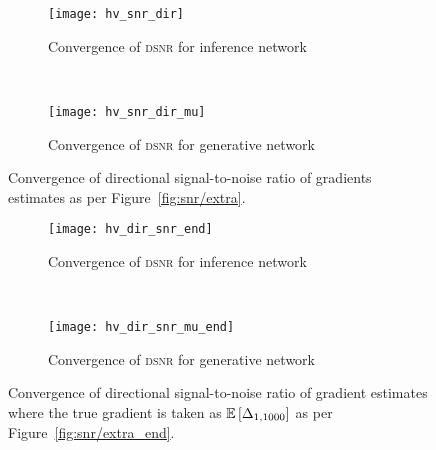 \begin{figure}[h]
	\centering
	\begin{subfigure}[b]{0.45\textwidth}
		\centering
		\texttt{[image: hv\_snr\_dir]}
		\caption{Convergence of \textsc{dsnr} for inference network\label{fig:hv/snr_dir}}
	\end{subfigure}~~~~~~~~~~
	\begin{subfigure}[b]{0.45\textwidth}
		\centering
		\texttt{[image: hv\_snr\_dir\_mu]}
		\caption{Convergence of \textsc{dsnr} for generative network\label{fig:hv/snr_dir_mu}}
	\end{subfigure}
	\caption{Convergence of directional signal-to-noise ratio of gradients estimates 
		as per Figure~\ref{fig:snr/extra}.
		\label{fig:hv/extra_end}}
\end{figure}

\begin{figure}[h]
	\centering
	\begin{subfigure}[b]{0.45\textwidth}
		\centering
		\texttt{[image: hv\_dir\_snr\_end]}
		\caption{Convergence of \textsc{dsnr} for inference network\label{fig:snr/hv_snr_dir_end}}
	\end{subfigure} ~~~~~~~~~~
	\begin{subfigure}[b]{0.45\textwidth}
		\centering
		\texttt{[image: hv\_dir\_snr\_mu\_end]}
		\caption{Convergence of \textsc{dsnr} for generative network\label{fig:snr/hv_snr_dir_mu_end}}
	\end{subfigure}
	\caption{Convergence of directional signal-to-noise ratio of gradient estimates where the
		true gradient is taken as $\mathbb{E} \left[\Delta_{1,1000}\right]$ as per
		Figure~\ref{fig:snr/extra_end}.
		\label{fig:snr/hv_extra_end}}
\end{figure}